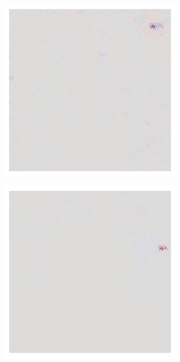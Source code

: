 \begin{figure}[H]
\begin{subfigure}{0.095\linewidth}
    \end{subfigure}\hfill%
    \begin{subfigure}{0.095\linewidth}
        \centering
        \includegraphics[height=1\linewidth]{01-images/05-resultate/uap_resnet18/uap0-resnet18-covidx_data-n200-robustificationslevel6.png}
    \end{subfigure}\hfill%
    \begin{subfigure}{0.095\linewidth}
        \centering
        \includegraphics[height=1\linewidth]{01-images/05-resultate/uap_resnet18/uap0-resnet18-covidx_data-n200-robustificationslevel7.png}

\end{subfigure}
\end{figure}
